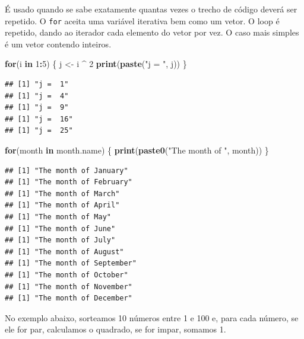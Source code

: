 \documentclass[
]{book}
\newenvironment{Shaded}{\begin{snugshade}}{\end{snugshade}}
\newcommand{\ControlFlowTok}[1]{\textcolor[rgb]{0.13,0.29,0.53}{\textbf{#1}}}
\newcommand{\DecValTok}[1]{\textcolor[rgb]{0.00,0.00,0.81}{#1}}
\newcommand{\FunctionTok}[1]{\textcolor[rgb]{0.13,0.29,0.53}{\textbf{#1}}}
\newcommand{\NormalTok}[1]{#1}
\newcommand{\OtherTok}[1]{\textcolor[rgb]{0.56,0.35,0.01}{#1}}
\newcommand{\SpecialCharTok}[1]{\textcolor[rgb]{0.81,0.36,0.00}{\textbf{#1}}}
\newcommand{\StringTok}[1]{\textcolor[rgb]{0.31,0.60,0.02}{#1}}
\begin{document}
É usado quando se sabe exatamente quantas vezes o trecho de código deverá ser repetido.
O \texttt{for} aceita uma variável iterativa bem como um vetor.
O loop é repetido, dando ao iterador cada elemento do vetor por vez.
O caso mais simples é um vetor contendo inteiros.

\begin{Shaded}
\begin{Highlighting}[]
\ControlFlowTok{for}\NormalTok{(i }\ControlFlowTok{in} \DecValTok{1}\SpecialCharTok{:}\DecValTok{5}\NormalTok{) \{}
\NormalTok{  j }\OtherTok{\textless{}{-}}\NormalTok{ i }\SpecialCharTok{\^{}} \DecValTok{2}
  \FunctionTok{print}\NormalTok{(}\FunctionTok{paste}\NormalTok{(}\StringTok{"j = "}\NormalTok{, j))}
\NormalTok{\}}
\end{Highlighting}
\end{Shaded}

\begin{verbatim}
## [1] "j =  1"
## [1] "j =  4"
## [1] "j =  9"
## [1] "j =  16"
## [1] "j =  25"
\end{verbatim}

\begin{Shaded}
\begin{Highlighting}[]
\ControlFlowTok{for}\NormalTok{(month }\ControlFlowTok{in}\NormalTok{ month.name)}
\NormalTok{\{}
 \FunctionTok{print}\NormalTok{(}\FunctionTok{paste0}\NormalTok{(}\StringTok{"The month of "}\NormalTok{, month))}
\NormalTok{\}}
\end{Highlighting}
\end{Shaded}

\begin{verbatim}
## [1] "The month of January"
## [1] "The month of February"
## [1] "The month of March"
## [1] "The month of April"
## [1] "The month of May"
## [1] "The month of June"
## [1] "The month of July"
## [1] "The month of August"
## [1] "The month of September"
## [1] "The month of October"
## [1] "The month of November"
## [1] "The month of December"
\end{verbatim}

No exemplo abaixo, sorteamos 10 números entre 1 e 100 e, para cada número, se ele for par, calculamos o quadrado, se for impar, somamos 1.
\end{document}
